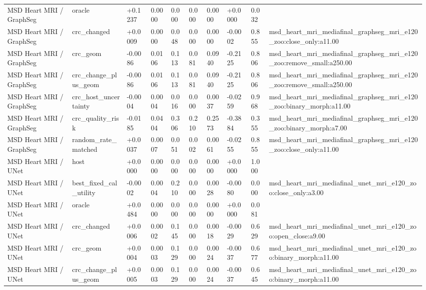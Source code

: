 \begin{table}[t]
\begin{tabular}{llllllllll}
MSD Heart MRI / GraphSeg & oracle & +0.1237 & 0.0000 & 0.000 & 0.000 & 0.0000 & +0.0000 & 0.032 &  \\
MSD Heart MRI / GraphSeg & crc\_changed & +0.0009 & 0.0000 & 0.048 & 0.000 & 0.0000 & -0.0002 & 0.855 & msd\_heart\_mri\_mediafinal\_graphseg\_mri\_e120\_zoo:close\_only:a11.00 \\
MSD Heart MRI / GraphSeg & crc\_geom & -0.0086 & 0.0106 & 0.113 & 0.081 & 0.0940 & -0.2125 & 0.806 & msd\_heart\_mri\_mediafinal\_graphseg\_mri\_e120\_zoo:remove\_small:a250.00 \\
MSD Heart MRI / GraphSeg & crc\_change\_plus\_geom & -0.0086 & 0.0106 & 0.113 & 0.081 & 0.0940 & -0.2125 & 0.806 & msd\_heart\_mri\_mediafinal\_graphseg\_mri\_e120\_zoo:remove\_small:a250.00 \\
MSD Heart MRI / GraphSeg & crc\_host\_uncertainty & -0.0004 & 0.0004 & 0.016 & 0.000 & 0.0037 & -0.0259 & 0.968 & msd\_heart\_mri\_mediafinal\_graphseg\_mri\_e120\_zoo:binary\_morph:a11.00 \\
MSD Heart MRI / GraphSeg & crc\_quality\_risk & -0.0185 & 0.0404 & 0.306 & 0.210 & 0.2573 & -0.3884 & 0.355 & msd\_heart\_mri\_mediafinal\_graphseg\_mri\_e120\_zoo:binary\_morph:a7.00 \\
MSD Heart MRI / GraphSeg & random\_rate\_matched & +0.0037 & 0.0007 & 0.051 & 0.002 & 0.0061 & -0.0255 & 0.855 & msd\_heart\_mri\_mediafinal\_graphseg\_mri\_e120\_zoo:close\_only:a11.00 \\
MSD Heart MRI / UNet & host & +0.0000 & 0.0000 & 0.000 & 0.000 & 0.0000 & +0.0000 & 1.000 &  \\
MSD Heart MRI / UNet & best\_fixed\_cal\_utility & -0.0002 & 0.0004 & 0.210 & 0.000 & 0.0028 & -0.0080 & 0.000 & msd\_heart\_mri\_mediafinal\_unet\_mri\_e120\_zoo:close\_only:a3.00 \\
MSD Heart MRI / UNet & oracle & +0.0484 & 0.0000 & 0.000 & 0.000 & 0.0000 & +0.0000 & 0.081 &  \\
MSD Heart MRI / UNet & crc\_changed & +0.0006 & 0.0002 & 0.145 & 0.000 & 0.0018 & -0.0029 & 0.629 & msd\_heart\_mri\_mediafinal\_unet\_mri\_e120\_zoo:open\_close:a9.00 \\
MSD Heart MRI / UNet & crc\_geom & +0.0004 & 0.0003 & 0.129 & 0.000 & 0.0024 & -0.0037 & 0.677 & msd\_heart\_mri\_mediafinal\_unet\_mri\_e120\_zoo:binary\_morph:a11.00 \\
MSD Heart MRI / UNet & crc\_change\_plus\_geom & +0.0005 & 0.0003 & 0.129 & 0.000 & 0.0024 & -0.0037 & 0.645 & msd\_heart\_mri\_mediafinal\_unet\_mri\_e120\_zoo:binary\_morph:a11.00 \\

\end{tabular}
\end{table}
